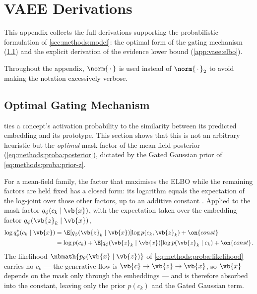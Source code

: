 \chapter{VAEE Derivations} \label{ch:app:vaee}

This appendix collects the full derivations supporting the probabilistic
formulation of \cref{sec:methods:model}: the
optimal form of the gating mechanism
(\cref{app:vaee:gating}) and the
explicit derivation of the evidence lower bound
(\cref{app:vaee:elbo}).

Throughout the appendix, $\norm{\,\cdot\,}$ is used instead of
$\norm{\,\cdot\,}_{2}$ to avoid making the notation excessively verbose.

\section{Optimal Gating Mechanism} \label{app:vaee:gating}

 ties a concept's activation
probability to the similarity between its predicted embedding and its prototype.
This section shows that this is not an arbitrary heuristic but the
\textit{optimal} mask factor of the mean-field posterior
(\cref{eq:methods:proba:posterior}), dictated by the Gated
Gaussian prior of \cref{eq:methods:proba:prior-z}.

For a mean-field family, the factor that maximises the \ac{ELBO} while the
remaining factors are held fixed has a closed form: its logarithm equals the
expectation of the log-joint over those other factors, up to an additive
constant \citep{bleiVariationalInferenceReview2017}. Applied to the mask factor
$q_\phi(c_k \mid \vb{x})$, with the expectation taken over the embedding factor
$q_\phi(\vb{z}_k \mid \vb{x})$,
\begin{equation} \label{eq:app:vaee:gating:optimality}
    \begin{split}
        \log q_\phi^{\star}(c_k \mid \vb{x})
        &= \E[q_\phi(\vb{z}_k \mid \vb{x})]{\log p(c_k, \vb{z}_k)} + \on{const} \\
        &= \log p(c_k) + \E[q_\phi(\vb{z}_k \mid \vb{x})]{\log p(\vb{z}_k \mid c_k)} + \on{const}.
    \end{split}
\end{equation}
The likelihood $\nbmath{p_\theta(\vb{x} \mid \vb{z})}$ of
\cref{eq:methods:proba:likelihood} carries no $c_k$ --- the
generative flow is $\vb{c} \to \vb{z} \to \vb{x}$, so $\vb{x}$ depends on the
mask only through the embeddings --- and is therefore absorbed into the
constant, leaving only the prior $p(c_k)$ and the Gated Gaussian term.

